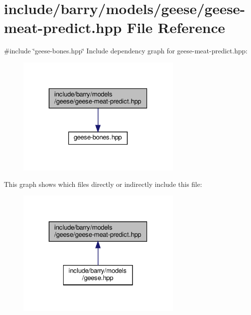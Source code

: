 \hypertarget{geese-meat-predict_8hpp}{}\section{include/barry/models/geese/geese-\/meat-\/predict.hpp File Reference}
\label{geese-meat-predict_8hpp}
{\ttfamily \#include \char`\"{}geese-\/bones.\+hpp\char`\"{}}\newline
Include dependency graph for geese-\/meat-\/predict.hpp\+:
\nopagebreak
\begin{figure}[H]
\begin{center}
\leavevmode
\includegraphics[width=231pt]{geese-meat-predict_8hpp__incl}
\end{center}
\end{figure}
This graph shows which files directly or indirectly include this file\+:
\nopagebreak
\begin{figure}[H]
\begin{center}
\leavevmode
\includegraphics[width=231pt]{geese-meat-predict_8hpp__dep__incl}
\end{center}
\end{figure}
